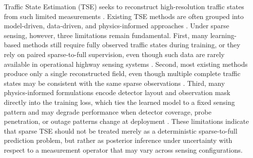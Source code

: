 \documentclass[a4paper,fleqn]{cas-sc}
\numberwithin{equation}{section}
\begin{document}

Traffic State Estimation (TSE) seeks to reconstruct high-resolution traffic states from such limited measurements \citep{seo2017traffic, wang2023low}. Existing TSE methods are often grouped into model-driven, data-driven, and physics-informed approaches \citep{seo2017traffic, shi2021physics, di2023physics}. Under sparse sensing, however, three limitations remain fundamental. First, many learning-based methods still require fully observed traffic states during training, or they rely on paired sparse-to-full supervision, even though such data are rarely available in operational highway sensing systems \citep{boquet2020variational, zhang2022tsr, mo2022trafficflowgan, lei2024conditional, lu2025diffusion, zhang2025tsgdiff}. Second, most existing methods produce only a single reconstructed field, even though multiple complete traffic states may be consistent with the same sparse observations \citep{treiber2002reconstructing, treiber2011reconstructing, tak2016data, rempe2022estimation, liu2021learning, shi2023physics}. Third, many physics-informed formulations encode detector layout and observation mask directly into the training loss, which ties the learned model to a fixed sensing pattern and may degrade performance when detector coverage, probe penetration, or outage patterns change at deployment \citep{huang2020physics, thodi2022incorporating, xue2024network}. These limitations indicate that sparse TSE should not be treated merely as a deterministic sparse-to-full prediction problem, but rather as posterior inference under uncertainty with respect to a measurement operator that may vary across sensing configurations.
\end{document}
